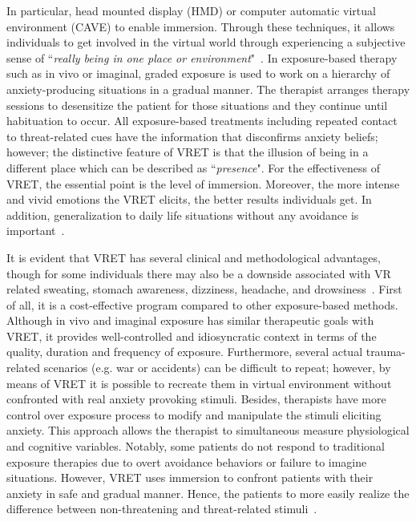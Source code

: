\documentclass{llncs}
\begin{document}
In particular, head mounted display (HMD) or computer automatic virtual environment (CAVE) to enable immersion. Through these techniques, it allows individuals to get involved in the virtual world through experiencing a subjective sense of ``\emph{really being in one place or environment}"~\cite{krijn2004virtual}. In exposure-based therapy such as in vivo or imaginal, graded exposure is used to work on a hierarchy of anxiety-producing situations in a gradual manner. The therapist arranges therapy sessions to desensitize the patient for those situations and they continue until habituation to occur. All exposure-based treatments including repeated contact to threat-related cues have the information that disconfirms anxiety beliefs; however; the distinctive feature of VRET is that the illusion of being in a different place which can be described as ``\emph{presence}". For the effectiveness of VRET, the essential point is the level of immersion. Moreover, the more intense and vivid emotions the VRET elicits, the better results individuals get. In addition, generalization to daily life situations without any avoidance is important~\cite{krijn2004virtual}. 


It is evident that VRET has several clinical and methodological advantages, though for some individuals there may also be a downside associated with VR related sweating, stomach awareness, dizziness, headache, and drowsiness~\cite{bush2008viability}. First of all, it is a cost-effective program compared to other exposure-based methods. Although in vivo and imaginal exposure has similar therapeutic goals with VRET, it provides well-controlled and idiosyncratic context in terms of the quality, duration and frequency of exposure. Furthermore, several actual trauma-related scenarios (e.g. war or accidents) can be difficult to repeat; however, by means of VRET it is possible to recreate them in virtual environment without confronted with real anxiety provoking stimuli. Besides, therapists have more control over exposure process to modify and manipulate the stimuli eliciting anxiety. This approach allows the therapist to simultaneous measure physiological and cognitive variables. Notably, some patients do not respond to traditional exposure therapies due to overt avoidance behaviors or failure to imagine situations. However, VRET uses immersion to confront patients with their anxiety in safe and gradual manner. Hence, the patients to more easily realize the difference between non-threatening and threat-related stimuli~\cite{morina2015can,tichon2006virtual}. 
\end{document}

